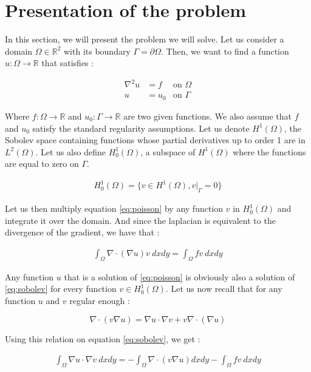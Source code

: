 \section{Presentation of the problem}

In this section, we will present the problem we will solve. Let us consider a domain $\Omega \in \mathbb{R}^2$ with its boundary $\Gamma = \partial\Omega$. Then, we want to find a function $u : \Omega \rightarrow \mathbb{R}$ that satisfies : 

\begin{align}
\nabla^2 u &= f &\text{on $\Omega$} \label{eq:poisson}\\
u &= u_0 &\text{on $\Gamma$}
\end{align}

Where $f : \Omega \rightarrow \mathbb{R}$ and $u_0 : \Gamma \rightarrow \mathbb{R}$ are two given functions. We also assume that $f$ and $u_0$ satisfy the standard regularity assumptions. Let us denote $H^1(\Omega)$, the Sobolev space containing functions whose partial derivatives up to order 1 are in $L^2(\Omega)$. Let us also define $H^1_0(\Omega)$, a subspace of $H^1(\Omega)$ where the functions are equal to zero on $\Gamma$. 

\begin{align*}
H_0^1(\Omega) = \{ v \in H^1(\Omega) , v|_\Gamma = 0 \}
\end{align*}

Let us then multiply equation \ref{eq:poisson} by any function $v$ in $H_0^1(\Omega)$ and  integrate it over the domain. And since the laplacian is equivalent to the divergence of the gradient, we have that : 

\begin{align}
\int_\Omega \nabla \cdot (\nabla u)v \:dxdy = \int_\Omega f v \:dxdy \label{eq:sobolev}
\end{align}

Any function $u$ that is a solution of \ref{eq:poisson} is obviously also a solution of \ref{eq:sobolev} for every function $v \in H_0^1(\Omega)$. Let us now recall that for any function $u$ and $v$ regular enough : 

$$\nabla \cdot (v\nabla u) = \nabla u \cdot \nabla v + v\nabla \cdot (\nabla u)$$

Using this relation on equation \ref{eq:sobolev}, we get : 

\begin{align}
\int_\Omega \nabla u \cdot \nabla v \:dxdy = -\int_\Omega \nabla \cdot (v\nabla u) dxdy -\int_\Omega f v \:dxdy
\end{align}

